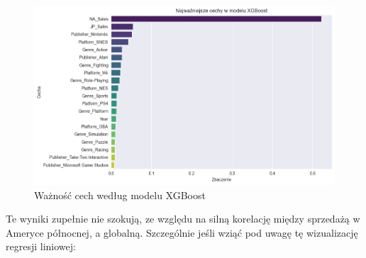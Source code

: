 \documentclass[11pt]{article}
\begin{document}
\begin{figure}[H]
    \centering
    \includegraphics[width=0.9\linewidth]{figures/xgboost-last}
    \caption{Ważność cech według modelu XGBoost}
    \label{fig:xgb_importance-last}
\end{figure}

Te wyniki zupełnie nie szokują, ze względu na silną korelację między sprzedażą w Ameryce północnej, a globalną.
Szczególnie jeśli wziąć pod uwagę tę wizualizację regresji liniowej:
\end{document}
